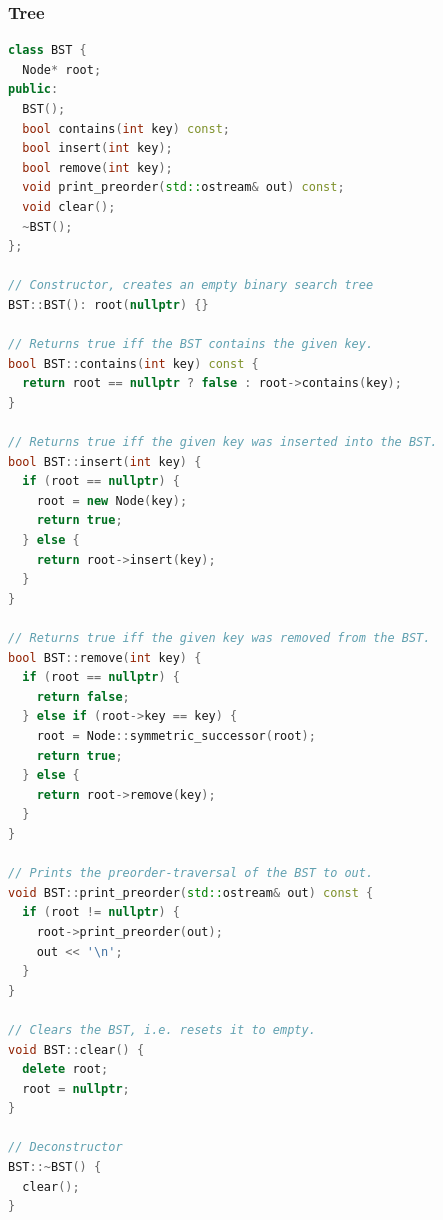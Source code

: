 \subsubsection{Tree}\smallskip
\begin{lstlisting}[language=C++]
class BST {
  Node* root;
public:
  BST();
  bool contains(int key) const;
  bool insert(int key);
  bool remove(int key);
  void print_preorder(std::ostream& out) const;
  void clear();
  ~BST();
};

// Constructor, creates an empty binary search tree
BST::BST(): root(nullptr) {}

// Returns true iff the BST contains the given key.
bool BST::contains(int key) const {
  return root == nullptr ? false : root->contains(key);
}
  
// Returns true iff the given key was inserted into the BST.
bool BST::insert(int key) {
  if (root == nullptr) {
    root = new Node(key);
    return true;
  } else {
    return root->insert(key);
  }
}
  
// Returns true iff the given key was removed from the BST.
bool BST::remove(int key) {
  if (root == nullptr) {
    return false;
  } else if (root->key == key) {
    root = Node::symmetric_successor(root);
    return true;
  } else {
    return root->remove(key);
  }
}
  
// Prints the preorder-traversal of the BST to out.
void BST::print_preorder(std::ostream& out) const {
  if (root != nullptr) {
    root->print_preorder(out);
    out << '\n';
  }
}

// Clears the BST, i.e. resets it to empty.
void BST::clear() {
  delete root;
  root = nullptr;
}

// Deconstructor
BST::~BST() {
  clear();
}
\end{lstlisting}




